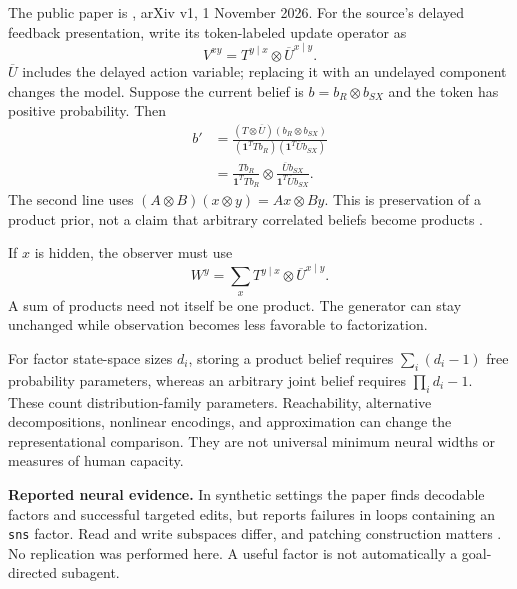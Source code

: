 \documentclass[11pt,letterpaper]{article}
\begin{document}

 The public paper is \citet{ehrlich2026feedback}, arXiv v1, 1 November 2026. For the source's delayed feedback presentation, write its token-labeled update operator as
\begin{equation}
 V^{xy}=T^{y\mid x}\otimes\overline U^{x\mid y}.
\end{equation}
$\overline U$ includes the delayed action variable; replacing it with an undelayed component changes the model. Suppose the current belief is $b=b_R\otimes b_{SX}$ and the token has positive probability. Then
\begin{align}
 b'&=\frac{(T\otimes\overline U)(b_R\otimes b_{SX})}
 {(\mathbf1^TTb_R)(\mathbf1^T\overline U b_{SX})}\\
 &=\frac{Tb_R}{\mathbf1^TTb_R}\otimes
 \frac{\overline U b_{SX}}{\mathbf1^T\overline U b_{SX}}.
\end{align}
The second line uses $(A\otimes B)(x\otimes y)=Ax\otimes By$. This is preservation of a product prior, not a claim that arbitrary correlated beliefs become products \citep[PDF pp. 24--25]{ehrlich2026feedback}.

If $x$ is hidden, the observer must use
\begin{equation}
 W^y=\sum_x T^{y\mid x}\otimes\overline U^{x\mid y}.
\end{equation}
A sum of products need not itself be one product. The generator can stay unchanged while observation becomes less favorable to factorization.

For factor state-space sizes $d_i$, storing a product belief requires $\sum_i(d_i-1)$ free probability parameters, whereas an arbitrary joint belief requires $\prod_i d_i-1$. These count distribution-family parameters. Reachability, alternative decompositions, nonlinear encodings, and approximation can change the representational comparison. They are not universal minimum neural widths or measures of human capacity.

\textbf{Reported neural evidence.} In synthetic settings the paper finds decodable factors and successful targeted edits, but reports failures in loops containing an \texttt{sns} factor. Read and write subspaces differ, and patching construction matters \citep[PDF pp. 5--9, 34--35]{ehrlich2026feedback}. No replication was performed here. A useful factor is not automatically a goal-directed subagent.
\end{document}
